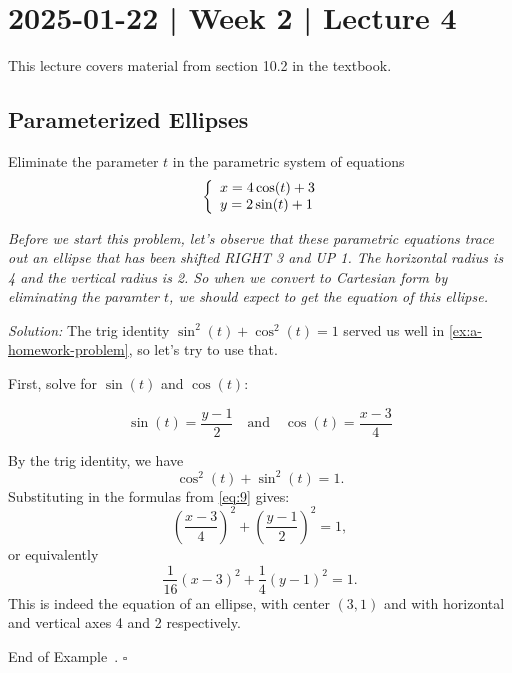 \documentclass[10pt]{article}
\theoremstyle{definition}
\newtheorem{example}[theorem]{Example}
\renewenvironment{example}
{\begin{oldexample}}
  {\par\smallskip\hfill   End of Example~\theexample. $\square$    \par\end{oldexample}}
\newcommand{\1}[1]{\textbf{1}_{\left[#1\right]}} %
\begin{document}
\section{2025-01-22 | Week 2 | Lecture 4}
This lecture covers material from section 10.2 in the textbook.
\begin{max-comment}
  \subsection{Parameterized Ellipses}

  \begin{example}[Eliminating a parameter]
    \label{ex:eliminating-parameter}
    Eliminate the parameter $t$ in the parametric system of equations
    \begin{equation*}
      \left\{ \begin{array}{l@{}l} x=4\cos(t)+3 \\ y=2\sin(t)+1\end{array}\right.
    \end{equation*}

    \textit{Before we start this problem, let's observe that these parametric
      equations trace out an ellipse that has been shifted RIGHT 3 and UP 1.
      The horizontal radius is 4 and the vertical radius is 2. So when we
      convert to Cartesian form by eliminating the paramter $t$, we should
      expect to get the equation of this ellipse. }

    \textit{Solution:} The trig identity $\sin^{2}(t) + \cos^{2}(t)=1$ served
    us well in \cref{ex:a-homework-problem}, so let's try to use that.

    First, solve for $\sin(t)$ and $\cos(t)$:

  \begin{equation}\label{eq:9}
    \sin(t) = \frac{y-1}{2} \quad \text{and} \quad \cos(t) = \frac{x-3}{4}
  \end{equation}

  By the trig identity, we have
  \begin{equation*}
    \cos^{2}(t) + \sin^{2}(t)  = 1.
  \end{equation*}
  Substituting in the formulas from \cref{eq:9} gives:
  \begin{equation*}
    \left( \frac{x-3}{4} \right)^{2} + \left( \frac{y-1}{2} \right)^{2}=1,
  \end{equation*}
  or equivalently
  \begin{equation*}
    \frac{1}{16}(x-3)^{2}+\frac{1}{4}(y-1)^{2} = 1.
  \end{equation*}
  This is indeed the equation of an ellipse, with center $(3,1)$ and with
  horizontal and vertical axes 4 and 2 respectively.
\end{example}


\end{max-comment}
\end{document}
